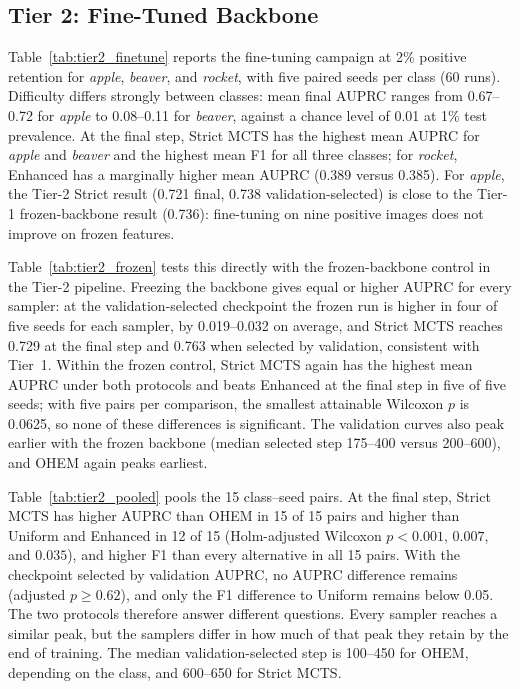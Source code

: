 \documentclass[11pt]{article}
\begin{document}
\subsection{Tier 2: Fine-Tuned Backbone}
\label{sec:tier2}
Table~\ref{tab:tier2_finetune} reports the fine-tuning campaign at 2\% positive retention for \textit{apple}, \textit{beaver}, and \textit{rocket}, with five paired seeds per class (60 runs). Difficulty differs strongly between classes: mean final AUPRC ranges from 0.67--0.72 for \textit{apple} to 0.08--0.11 for \textit{beaver}, against a chance level of 0.01 at 1\% test prevalence. At the final step, Strict MCTS has the highest mean AUPRC for \textit{apple} and \textit{beaver} and the highest mean F1 for all three classes; for \textit{rocket}, Enhanced has a marginally higher mean AUPRC (0.389 versus 0.385). For \textit{apple}, the Tier-2 Strict result (0.721 final, 0.738 validation-selected) is close to the Tier-1 frozen-backbone result (0.736): fine-tuning on nine positive images does not improve on frozen features.

Table~\ref{tab:tier2_frozen} tests this directly with the frozen-backbone control in the Tier-2 pipeline. Freezing the backbone gives equal or higher AUPRC for every sampler: at the validation-selected checkpoint the frozen run is higher in four of five seeds for each sampler, by 0.019--0.032 on average, and Strict MCTS reaches 0.729 at the final step and 0.763 when selected by validation, consistent with Tier~1. Within the frozen control, Strict MCTS again has the highest mean AUPRC under both protocols and beats Enhanced at the final step in five of five seeds; with five pairs per comparison, the smallest attainable Wilcoxon $p$ is 0.0625, so none of these differences is significant. The validation curves also peak earlier with the frozen backbone (median selected step 175--400 versus 200--600), and OHEM again peaks earliest.


Table~\ref{tab:tier2_pooled} pools the 15 class--seed pairs. At the final step, Strict MCTS has higher AUPRC than OHEM in 15 of 15 pairs and higher than Uniform and Enhanced in 12 of 15 (Holm-adjusted Wilcoxon $p < 0.001$, $0.007$, and $0.035$), and higher F1 than every alternative in all 15 pairs. With the checkpoint selected by validation AUPRC, no AUPRC difference remains (adjusted $p \ge 0.62$), and only the F1 difference to Uniform remains below 0.05. The two protocols therefore answer different questions. Every sampler reaches a similar peak, but the samplers differ in how much of that peak they retain by the end of training. The median validation-selected step is 100--450 for OHEM, depending on the class, and 600--650 for Strict MCTS.
\end{document}
